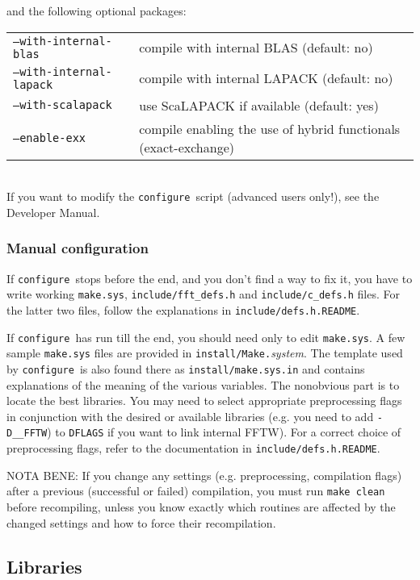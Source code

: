 \documentclass[12pt,a4paper]{article}
\def\configure{\texttt{configure}}
\begin{document}
and the following optional packages:\\
\begin{tabular}{ll}
\texttt{--with-internal-blas}&    compile with internal BLAS (default: no)\\
\texttt{--with-internal-lapack}&  compile with internal LAPACK (default: no)\\
\texttt{--with-scalapack}&        use ScaLAPACK if available (default: yes)\\
\texttt{--enable-exx}&            compile enabling the use of hybrid functionals (exact-exchange)\\
\end{tabular}\\
If you want to modify the \configure\ script (advanced users only!), 
see the Developer Manual.

\subsubsection{Manual configuration}
\label{SubSec:manconf}
If \configure\ stops before the end, and you don't find a way to fix
it, you have to write working \texttt{make.sys}, \texttt{include/fft\_defs.h}
and \texttt{include/c\_defs.h} files. 
For the latter two files, follow the explanations in 
\texttt{include/defs.h.README}.

If \configure\ has run till the end, you should need only to
edit \texttt{make.sys}. A few sample \texttt{make.sys} files
are provided in \texttt{install/Make.}{\em system}. The template used 
by \configure\ is also found there as \texttt{install/make.sys.in} 
and contains explanations of the meaning
of the various variables. The nonobvious part is to locate the
best libraries. You may need to select appropriate preprocessing flags
in conjunction with the desired or available
libraries (e.g. you need to add \texttt{-D\_\_FFTW}) to \texttt{DFLAGS}
if you want to link internal FFTW). For a correct choice of preprocessing 
flags, refer to the documentation in \texttt{include/defs.h.README}.

NOTA BENE: If you change any settings (e.g. preprocessing,
compilation flags) 
after a previous (successful or failed) compilation, you must run 
\texttt{make clean} before recompiling, unless you know exactly which 
routines are affected by the changed settings and how to force their recompilation.

\subsection{Libraries}
\label{Sec:Libraries}
\end{document}
